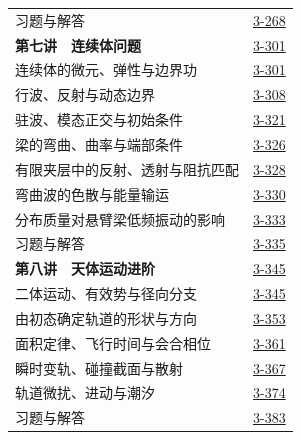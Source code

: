 \begin{longtable}{@{}p{}r@{}}
\hspace{1em}习题与解答&\href{course-page:3:271}{3-268}\\[2pt]
\textbf{第七讲　连续体问题}&\href{course-page:3:304}{3-301}\\[2pt]
\hspace{1em}连续体的微元、弹性与边界功&\href{course-page:3:304}{3-301}\\[2pt]
\hspace{1em}行波、反射与动态边界&\href{course-page:3:311}{3-308}\\[2pt]
\hspace{1em}驻波、模态正交与初始条件&\href{course-page:3:324}{3-321}\\[2pt]
\hspace{1em}梁的弯曲、曲率与端部条件&\href{course-page:3:329}{3-326}\\[2pt]
\hspace{1em}有限夹层中的反射、透射与阻抗匹配&\href{course-page:3:331}{3-328}\\[2pt]
\hspace{1em}弯曲波的色散与能量输运&\href{course-page:3:333}{3-330}\\[2pt]
\hspace{1em}分布质量对悬臂梁低频振动的影响&\href{course-page:3:336}{3-333}\\[2pt]
\hspace{1em}习题与解答&\href{course-page:3:338}{3-335}\\[2pt]
\textbf{第八讲　天体运动进阶}&\href{course-page:3:348}{3-345}\\[2pt]
\hspace{1em}二体运动、有效势与径向分支&\href{course-page:3:348}{3-345}\\[2pt]
\hspace{1em}由初态确定轨道的形状与方向&\href{course-page:3:356}{3-353}\\[2pt]
\hspace{1em}面积定律、飞行时间与会合相位&\href{course-page:3:364}{3-361}\\[2pt]
\hspace{1em}瞬时变轨、碰撞截面与散射&\href{course-page:3:370}{3-367}\\[2pt]
\hspace{1em}轨道微扰、进动与潮汐&\href{course-page:3:377}{3-374}\\[2pt]
\hspace{1em}习题与解答&\href{course-page:3:386}{3-383}\\[2pt]
\end{longtable}

